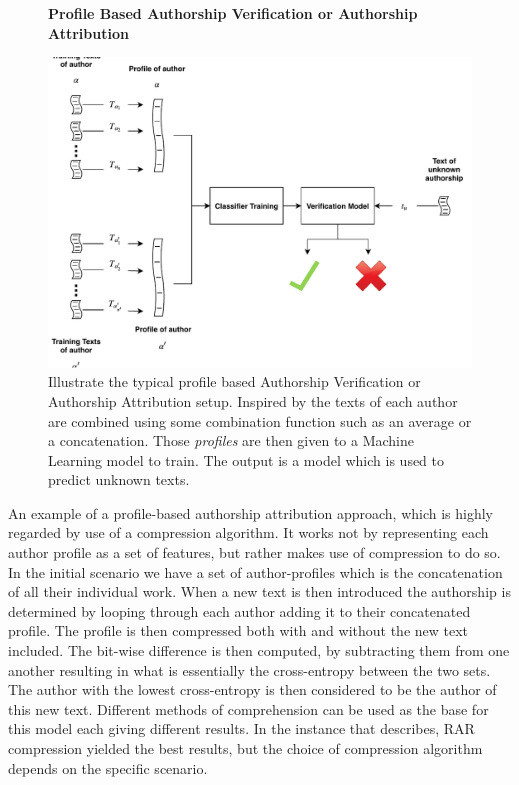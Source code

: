 \begin{figure}[htb]
    \centering
    \textbf{Profile Based Authorship Verification or Authorship Attribution}\par\medskip
    \includegraphics[scale=0.5]{./pictures/method/profile_based}
    \caption{Illustrate the typical profile based Authorship Verification or
        Authorship Attribution setup. Inspired by \citet{stamatos2009} the texts
        of each author are combined using some combination function such as an
        average or a concatenation. Those \textit{profiles} are then given to a
        Machine Learning model to train. The output is a model which is used to
        predict unknown texts.}
    \label{fig:profile_based}
\end{figure}

An example of a profile-based authorship attribution approach, which is highly
regarded by \citet{stamatos2009} use of a compression algorithm. It works not by
representing each author profile as a set of features, but rather makes use of
compression to do so. In the initial scenario we have a set of author-profiles
which is the concatenation of all their individual work. When a new text is then
introduced the authorship is determined by looping through each author adding
it to their concatenated profile. The profile is then compressed both with
and without the new text included. The bit-wise difference is then computed,
by subtracting them from one another resulting in what is essentially the
cross-entropy between the two sets. The author with the lowest cross-entropy
is then considered to be the author of this new text. Different methods of
comprehension can be used as the base for this model each giving different
results. In the instance that \citet{stamatos2009} describes, RAR compression
yielded the best results, but the choice of compression algorithm depends on the
specific scenario.

